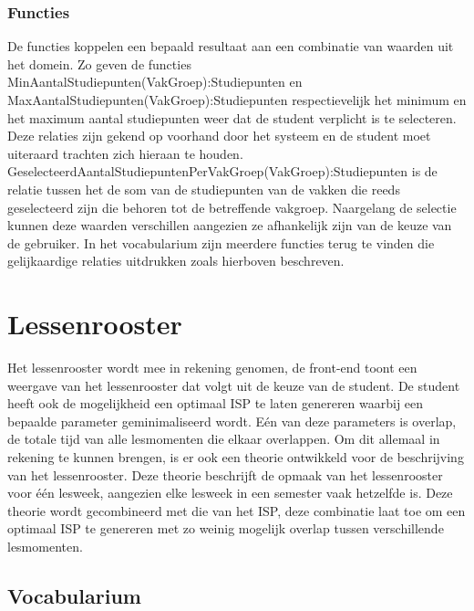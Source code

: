 \subsubsection{Functies}
De functies koppelen een bepaald resultaat aan een combinatie van waarden uit het domein. Zo geven de functies MinAantalStudiepunten(VakGroep):Studiepunten en MaxAantalStudiepunten(VakGroep):Studiepunten respectievelijk het minimum en het maximum aantal studiepunten weer dat de student verplicht is te selecteren. Deze relaties zijn gekend op voorhand door het systeem en de student moet uiteraard trachten zich hieraan te houden. GeselecteerdAantalStudiepuntenPerVakGroep(VakGroep):Studiepunten is de relatie tussen het de som van de studiepunten van de vakken die reeds geselecteerd zijn die behoren tot de betreffende vakgroep. Naargelang de selectie kunnen deze waarden verschillen aangezien ze afhankelijk zijn van de keuze van de gebruiker. In het vocabularium zijn meerdere functies terug te vinden die gelijkaardige relaties uitdrukken zoals hierboven beschreven. 

\section{Lessenrooster}
Het lessenrooster wordt mee in rekening genomen, de front-end toont een weergave van het lessenrooster dat volgt uit de keuze van de student. De student heeft ook de mogelijkheid een optimaal ISP te laten genereren waarbij een bepaalde parameter geminimaliseerd wordt. E\'{e}n van deze parameters is overlap, de totale tijd van alle lesmomenten die elkaar overlappen. Om dit allemaal in rekening te kunnen brengen, is er ook een theorie ontwikkeld voor de beschrijving van het lessenrooster. Deze theorie beschrijft de opmaak van het lessenrooster voor \'{e}\'{e}n lesweek, aangezien elke lesweek in een semester vaak hetzelfde is. Deze theorie wordt gecombineerd met die van het ISP, deze combinatie laat toe om een optimaal ISP te genereren met zo weinig mogelijk overlap tussen verschillende lesmomenten.

\subsection{Vocabularium}

